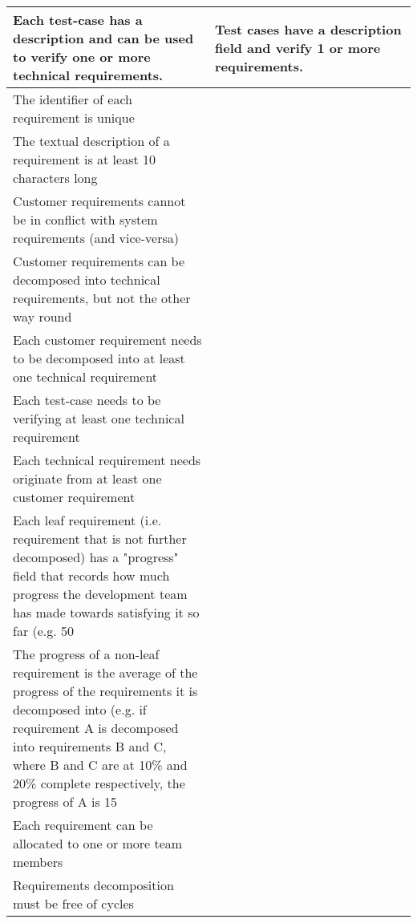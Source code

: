 \documentclass[11pt,a4paper]{scrartcl}
\begin{document}
\begin{center}
\begin{longtable}{| p{0.5\linewidth} | p{0.5\linewidth} |}
		Each test-case has a description and can be used to verify one or more technical requirements.
		& Test cases have a description field and verify 1 or more requirements. \\ \hline
		The identifier of each requirement is unique
		& \\ \hline
		The textual description of a requirement is at least 10 characters long
		& \\ \hline
		Customer requirements cannot be in conflict with system requirements (and vice-versa)
		& \\ \hline
		Customer requirements can be decomposed into technical requirements, but not the other way round
		& \\ \hline
		Each customer requirement needs to be decomposed into at least one technical requirement
		& \\ \hline
		Each test-case needs to be verifying at least one technical requirement
		& \\ \hline
		Each technical requirement needs originate from at least one customer requirement
		& \\ \hline
		Each leaf requirement (i.e. requirement that is not further decomposed) has a "progress" field that records how much progress the development team has made towards satisfying it so far (e.g. 50%
		& \\ \hline
		The progress of a non-leaf requirement is the average of the progress of the requirements it is decomposed into (e.g. if requirement A is decomposed into requirements B and C, where B and C are at 10\% and 20\% complete respectively, the progress of A is 15%
		& \\ \hline
		Each requirement can be allocated to one or more team members
		& \\ \hline
		Requirements decomposition must be free of cycles
		& \\ \hline
		
		\hline
	\end{longtable}
\end{center}	

	
\end{document}
